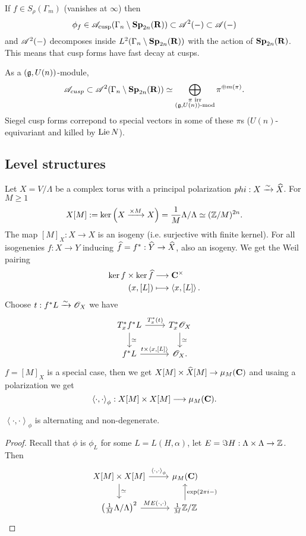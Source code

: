 If $f\in S_\rho(\Gamma_m)$ (vanishes at $\infty$) then
\[
	\phi_f\in \mathscr{A}_{\text{cusp}}(\Gamma_n\setminus\mathbf{Sp}_{2n}(\mathbf{R})) \subset \mathscr{A}^2(-) \subset \mathscr{A}(-)
\] 
and $\mathscr{A}^2(-)$ decomposes inside $L^2(\Gamma_n\setminus\mathbf{Sp}_{2n}(\mathbf{R}))$ with the action of $\mathbf{Sp}_{2n}(\mathbf{R})$. This means that cusp forms have fast decay at cusps.

As a $(\mathfrak{g},U(n))$-module,
\[
	\mathscr{A}_{cusp}\subset \mathscr{A}^2(\Gamma_n\setminus\mathbf{Sp}_{2n}(\mathbf{R})) \simeq \bigoplus_{\substack{\pi\text{ irr} \\ (\mathfrak{g},U(n))\text{-mod}}}\pi^{\oplus m(\pi)}.
\] 
Siegel cusp forms correpond to special vectors in some of these $\pi$s ($U(n)$-equivariant and killed by $\operatorname{Lie} N$).

\subsection{Level structures}
Let $X = V /\Lambda$ be a complex torus with a principal polarization $phi:X\xrightarrow{\sim} \widehat{X}$. For $M\ge 1$ 
\[
	X[M] := \operatorname{ker}\left( X\xrightarrow{\times M}X \right) = \frac{1}{M}\Lambda /\Lambda \simeq (\mathbb Z /M)^{2n}.
\] 
The map $[M]_X:X\to X$ is an isogeny (i.e. surjective with finite kernel). For all isogenenies $f:X\to Y$ inducing $\wh{f}=f^{*}:\wh{Y}\to \wh{X}$, also an isogeny. We get the Weil pairing
\begin{align*}
	\operatorname{ker} f\times \operatorname{ker}\widehat{f} &\longrightarrow \mathbf{C}^{\times} \\
	(x,[L]) &\longmapsto \left<x,[L] \right>
.\end{align*}
Choose $t:f^{*}L\xrightarrow{\sim} \mathscr{O}_X$ we have
\[
\begin{tikzcd}
	T_x^{*}f^{*}L \ar[r,"{T_x^{*}(t)}"] \ar[d,"\isoto"] & T_x^{*}\OO_X \ar[d,"\isoto"] \\
	f^{*}L \ar[r,"{t\times \left<x,[L] \right>}"] & \OO_X.
\end{tikzcd}
\] 
$f=[M]_X$ is a special case, then we get $X[M]\times \wh{X}[M]\to \mu_M(\bb{C})$ and usaing a polarization we get
\[
	\left<\cdot ,\cdot  \right>_\phi:X[M]\times X[M]\to \mu_M(\bb{C}).
\] 
\begin{proposition}
	$\left<\cdot ,\cdot  \right>_\phi$ is alternating and non-degenerate.
\end{proposition}
\begin{proof}
	Recall that $\phi$ is $\phi_L$ for some $L=L(H,\alpha)$, let $E=\Im H:\Lambda\times \Lambda\to \Z$. Then
	\[
	\begin{tikzcd}
		X[M] \times X[M] \ar[r,"{\left<\cdot ,\cdot  \right>_\phi}"] \ar[d,"\isoto"] & \mu_M(\bb{C}) \\
		\left( \frac{1}{M}\Lambda /\Lambda \right) ^2 \ar[r,"{ME(\cdot ,\cdot )}"] & \frac{1}{M}\Z /\Z \ar[u,"{\exp(2\pi i -)}"']
	\end{tikzcd}
	\] 
\end{proof}
